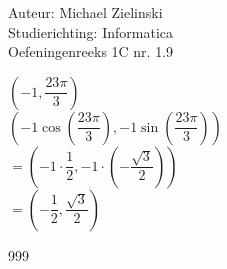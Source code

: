\documentclass[a4paper]{article}
\begin{document}
  
\noindent \large Auteur: Michael Zielinski \\
\noindent \large Studierichting: Informatica\\
\noindent \large Oefeningenreeks 1C nr. 1.9\\

\medskip

\normalsize

$\left(-1, \dfrac{23\pi}{3}\right)$\\

$\left(-1 \cos\left(\dfrac{23\pi}{3}\right), -1 \sin\left(\dfrac{23\pi}{3}\right)\right)$\\

$=\left(-1 \cdot \dfrac{1}{2}, -1 \cdot \left(-\dfrac{\sqrt{3}}{2}\right)\right)$\\

$=\left(-\dfrac{1}{2}, \dfrac{\sqrt{3}}{2}\right)$

\begin{thebibliography}{999}
\end{thebibliography}
\end{document}
